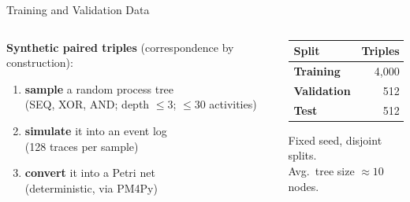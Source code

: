 \documentclass[aspectratio=169]{beamer}
\newcommand{\keyc}[1]{\textbf{\textcolor{procblue}{#1}}}
\begin{document}
\begin{frame}{Training and Validation Data}
  \begin{columns}[T]
  \begin{column}{0.55\textwidth}
    \textbf{Synthetic paired triples} (correspondence by construction):
    \vspace{2mm}
    \begin{enumerate}\setlength{\itemsep}{5pt}
      \item \keyc{sample} a random process tree\\(SEQ, XOR, AND; depth $\le 3$; $\le 30$ activities)
      \item \keyc{simulate} it into an event log\\(128 traces per sample)
      \item \keyc{convert} it into a Petri net\\(deterministic, via PM4Py)
    \end{enumerate}
  \end{column}
  \begin{column}{0.41\textwidth}
    \begin{center}
    \begin{tabular}{lr}
      \toprule
      Split & Triples \\
      \midrule
      \keyc{Training} & 4{,}000 \\
      \keyc{Validation} & 512 \\
      \keyc{Test} & 512 \\
      \bottomrule
    \end{tabular}
    \end{center}
    \vspace{2mm}
    \small Fixed seed, disjoint splits.\\
    Avg.\ tree size $\approx 10$ nodes.
  \end{column}
  \end{columns}
\end{frame}
\end{document}
